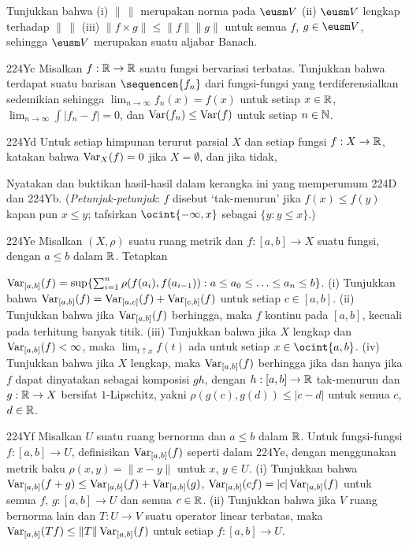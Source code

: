 {\noindent Tunjukkan bahwa (i) $\|\,\|$ merupakan norma pada $\eusm V$
(ii) $\eusm V$ lengkap terhadap $\|\,\|$ (iii)
$\|f\times g\|\le\|f\|\|g\|$ untuk semua $f$, $g\in\eusm V$, sehingga
$\eusm V$ merupakan suatu aljabar Banach.

\spheader 224Yc Misalkan $f:\Bbb R\to\Bbb R$ suatu fungsi bervariasi
terbatas.
Tunjukkan bahwa terdapat suatu barisan $\sequencen{f_n}$ dari fungsi-fungsi
yang terdiferensialkan
sedemikian sehingga $\lim_{n\to\infty}f_n(x)=f(x)$ untuk setiap
$x\in\Bbb R$, $\lim_{n\to\infty}\int|f_n-f|=0$, dan
$\mathop{\text{Var}}(f_n)\le\mathop{\text{Var}}(f)$ untuk setiap $n\in\Bbb N$. 

\spheader 224Yd Untuk setiap himpunan terurut parsial $X$ dan setiap
fungsi $f:X\to\Bbb R$, katakan bahwa $\mathop{\text{Var}}_X(f)=0$ jika $X=\emptyset$,
dan jika tidak,


\noindent Nyatakan dan buktikan hasil-hasil dalam kerangka ini yang
memperumum 224D dan 224Yb. ({\it Petunjuk-petunjuk\/}: $f$ disebut
`tak-menurun' jika $f(x)\le f(y)$ kapan pun $x\le y$; tafsirkan
$\ocint{-\infty,x}$ sebagai $\{y:y\le x\}$.)

\spheader 224Ye Misalkan $(X,\rho)$ suatu ruang metrik dan
$f:[a,b]\to X$ suatu fungsi, dengan $a\le b$ dalam $\Bbb R$. Tetapkan
\ifnum{}


\noindent\else
$\mathop{\text{Var}}_{[a,b]}(f)
=\sup\{\sum_{i=1}^n\rho(f(a_i),f(a_{i-1})):
a\le a_0\le\ldots\le a_n\le b\}$. \fi
(i) Tunjukkan bahwa
$\mathop{\text{Var}}_{[a,b]}(f)=\mathop{\text{Var}}_{[a,c]}(f)+\mathop{\text{Var}}_{[c,b]}(f)$ untuk setiap
$c\in[a,b]$.
(ii) Tunjukkan bahwa jika $\mathop{\text{Var}}_{[a,b]}(f)$ berhingga, maka $f$ kontinu
pada $[a,b]$, kecuali pada terhitung banyak titik.
(iii) Tunjukkan bahwa jika $X$ lengkap dan $\mathop{\text{Var}}_{[a,b]}(f)<\infty$, maka
$\lim_{t\uparrow x}f(t)$ ada untuk setiap $x\in\ocint{a,b}$.
(iv) Tunjukkan bahwa jika $X$ lengkap, maka $\mathop{\text{Var}}_{[a,b]}(f)$ berhingga
jika dan hanya jika $f$ dapat dinyatakan sebagai komposisi $gh$, dengan
$h:[a,b]\to\Bbb R$ tak-menurun dan $g:\Bbb R\to X$ bersifat
$1$-Lipschitz, yakni $\rho(g(c),g(d))\le|c-d|$ untuk semua $c$,
$d\in\Bbb R$.

\spheader 224Yf Misalkan $U$ suatu ruang bernorma dan $a\le b$ dalam
$\Bbb R$. Untuk fungsi-fungsi $f:[a,b]\to U$, definisikan
$\mathop{\text{Var}}_{[a,b]}(f)$ seperti dalam 224Ye, dengan menggunakan metrik baku
$\rho(x,y)=\|x-y\|$ untuk $x$, $y\in U$. (i) Tunjukkan bahwa
$\mathop{\text{Var}}_{[a,b]}(f+g)\le\mathop{\text{Var}}_{[a,b]}(f)+\mathop{\text{Var}}_{[a,b]}(g)$,
$\mathop{\text{Var}}_{[a,b]}(cf)=|c|\mathop{\text{Var}}_{[a,b]}(f)$ untuk semua $f$, $g:[a,b]\to U$
dan semua $c\in\Bbb R$. (ii) Tunjukkan bahwa jika $V$ ruang bernorma lain
dan $T:U\to V$ suatu operator linear terbatas, maka
$\mathop{\text{Var}}_{[a,b]}(Tf)\le\|T\|\mathop{\text{Var}}_{[a,b]}(f)$ untuk setiap $f:[a,b]\to U$.

}

